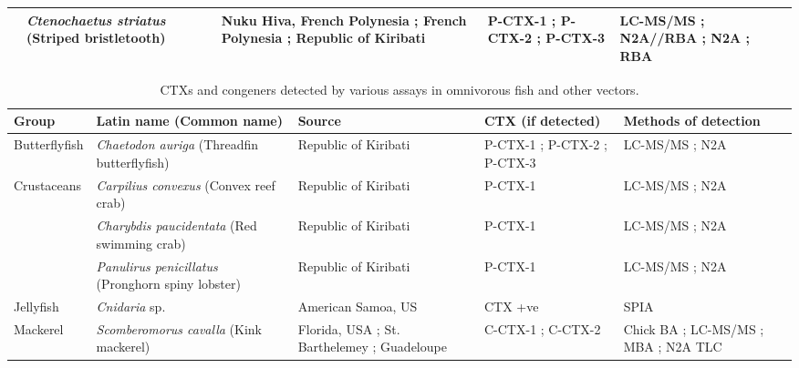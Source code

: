 \documentclass[12pt]{article}
\begin{document}
\begin{longtable}[l]{ | p{2cm} | p{3cm} | p{4.5cm} | p{2cm} | p{3cm} | }
	& \emph{Ctenochaetus striatus} (Striped bristletooth) & Nuku Hiva, French Polynesia \cite{darius2007ciguatera}; French Polynesia \cite{chinain2014mail}; Republic of Kiribati \cite{mak2013pacific} & P-CTX-1 \cite{mak2013pacific}; P-CTX-2 \cite{mak2013pacific}; P-CTX-3 \cite{mak2013pacific} & LC-MS/MS \cite{mak2013pacific}; N2A//RBA \cite{chinain2014mail}; N2A \cite{mak2013pacific}; RBA \cite{darius2007ciguatera} \\
	\hline
	\end{longtable}
	\FloatBarrier
	
	\begin{longtable}[l]{ | p{2cm} | p{3cm} | p{4.5cm} | p{2cm} | p{3cm} | }
	\caption{CTXs and congeners detected by various assays in omnivorous fish and other vectors.}\\
	\hline
	\label{tbl:OmniTable}
	\textbf{Group} & \textbf{Latin name} (Common name) & \textbf{Source} & \textbf{CTX (if detected)} & \textbf{Methods of detection} \\
	\hline
	Butterflyfish & \emph{Chaetodon auriga} (Threadfin butterflyfish) & Republic of Kiribati \cite{mak2013pacific} & P-CTX-1 \cite{mak2013pacific}; P-CTX-2 \cite{mak2013pacific}; P-CTX-3 \cite{mak2013pacific} & LC-MS/MS \cite{mak2013pacific}; N2A \cite{mak2013pacific} \\
	\hline
	Crustaceans & \emph{Carpilius convexus} (Convex reef crab) & Republic of Kiribati \cite{mak2013pacific} & P-CTX-1 \cite{mak2013pacific} & LC-MS/MS \cite{mak2013pacific}; N2A \cite{mak2013pacific} \\
	& \emph{Charybdis paucidentata} (Red swimming crab) & Republic of Kiribati \cite{mak2013pacific} & P-CTX-1 \cite{mak2013pacific} & LC-MS/MS \cite{mak2013pacific}; N2A \cite{mak2013pacific} \\
	& \emph{Panulirus penicillatus} (Pronghorn spiny lobster) & Republic of Kiribati \cite{mak2013pacific} & P-CTX-1 \cite{mak2013pacific} & LC-MS/MS \cite{mak2013pacific}; N2A \cite{mak2013pacific} \\
	\hline
	Jellyfish & \emph{Cnidaria} sp. & American Samoa, US \cite{zlotnick1995ciguatera} & CTX +ve \cite{zlotnick1995ciguatera} & SPIA \cite{zlotnick1995ciguatera} \\
	\hline
	Mackerel & \emph{Scomberomorus cavalla} (Kink mackerel) & Florida, USA \cite{dickey2008ciguatera}; St. Barthelemey \cite{pottier2001ciguatera,vernoux1986heterogeneity}; Guadeloupe \cite{pottier2001ciguatera} & C-CTX-1 \cite{dickey2008ciguatera}; C-CTX-2 \cite{dickey2008ciguatera} & Chick BA \cite{pottier2001ciguatera}; LC-MS/MS \cite{dickey2008ciguatera}; MBA \cite{vernoux1986heterogeneity}; N2A \cite{dickey2008ciguatera} TLC \cite{vernoux1986heterogeneity} \\

\end{longtable}
\end{document}

